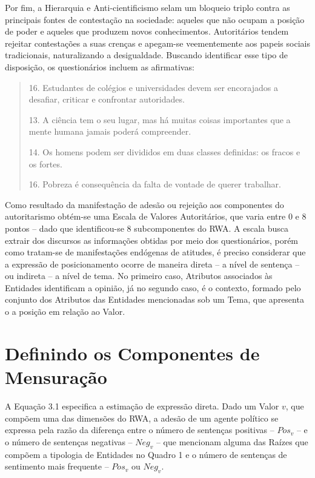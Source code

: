 \documentclass[
12pt,				%
openright,			%
twoside,			%
a4paper,			%
english,			%
french,				%
spanish,			%
brazil				%
]{abntex2}
\begin{document}
Por fim, a Hierarquia e Anti-cientificismo selam um bloqueio triplo contra as principais fontes de contestação na sociedade: aqueles que não ocupam a posição de poder e aqueles que produzem novos conhecimentos. Autoritários tendem rejeitar contestações a suas crenças e apegam-se veementemente aos papeis sociais tradicionais, naturalizando a desigualdade. Buscando identificar esse tipo de disposição, os questionários incluem as afirmativas:
 
\begin{quote}
	
	16. Estudantes de colégios e universidades devem ser encorajados a desafiar, criticar e confrontar autoridades.
	
	13. A ciência tem o seu lugar, mas há muitas coisas importantes que a mente humana jamais poderá compreender.
	
	14. Os homens podem ser divididos  em duas classes definidas:  os fracos e os fortes.
	
	16. Pobreza é consequência da falta de vontade de querer trabalhar.
	
	\cite{vilanova2018adaptaccao, de2018analises}
	
\end{quote}

Como resultado da manifestação de adesão ou rejeição aos componentes do autoritarismo obtém-se uma Escala de Valores Autoritários, que varia entre 0 e 8 pontos -- dado que identificou-se 8 subcomponentes do RWA. A escala busca extrair dos discursos as informações obtidas por meio dos questionários, porém como tratam-se de manifestações endógenas de atitudes, é preciso considerar que a expressão de posicionamento ocorre de maneira direta -- a nível de sentença -- ou indireta -- a nível de tema. No primeiro caso, Atributos associados às Entidades identificam a opinião, já no segundo caso, é o contexto, formado pelo conjunto dos Atributos das Entidades mencionadas sob um Tema, que apresenta o a posição em relação ao Valor. 

\section{Definindo os Componentes de Mensuração}

A Equação 3.1 especifica a estimação de expressão direta. Dado um Valor $v$, que compõem uma das dimensões do RWA, a adesão de um agente político se expressa pela razão da diferença entre o número de sentenças positivas -- $Pos_v$ --  e o número de sentenças negativas -- $Neg_v$ -- que mencionam alguma das Raízes que compõem a tipologia de Entidades no Quadro 1 e o número de sentenças de sentimento mais frequente -- $Pos_v$ ou $Neg_v$.
\end{document}
